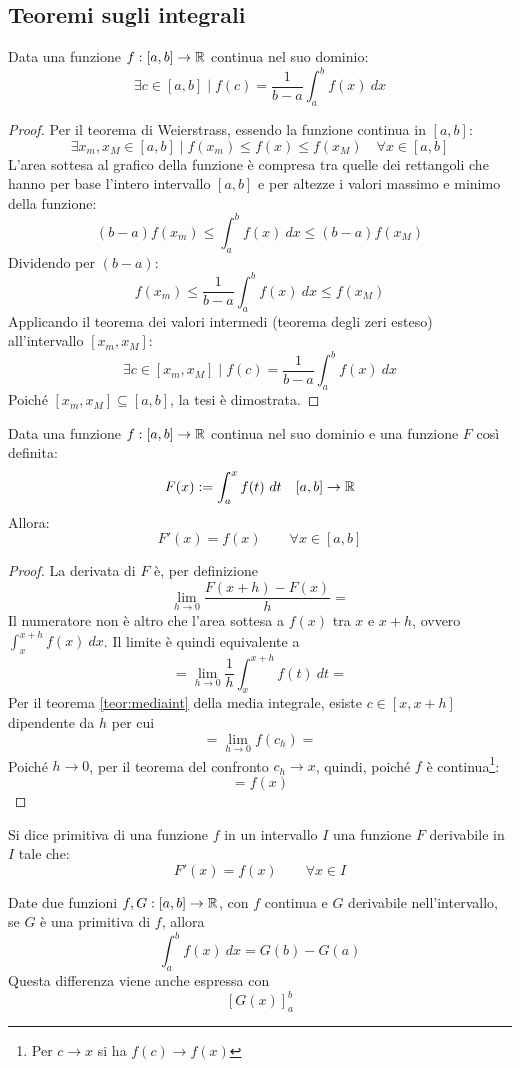 \subsection{Teoremi sugli integrali}
\begin{teor}
	\label{teor:mediaint}
	Data una funzione $f:[a,b]\to\mathbb{R}$ continua nel suo dominio:
	\[
		\exists c\in[a,b]\mid f(c)=\frac{1}{b-a}\int_a^b f(x)~dx
	\]
\end{teor}
\begin{proof}
	Per il teorema di Weierstrass, essendo la funzione continua in $[a,b]$:
	\[
		\exists x_m,x_M\in[a,b]\mid f(x_m)\leq f(x)\leq f(x_M)\quad\forall x\in[a,b]
	\]
	L'area sottesa al grafico della funzione è compresa tra quelle dei rettangoli che hanno per base l'intero intervallo $[a,b]$ e per altezze i valori massimo e minimo della funzione:
	\[
		(b-a)f(x_m)\leq \int_a^b f(x)~dx \leq (b-a)f(x_M)
	\]
	Dividendo per $(b-a)$:
	\[
		f(x_m)\leq \frac{1}{b-a}\int_a^b f(x)~dx \leq f(x_M)
	\]
	Applicando il teorema dei valori intermedi (teorema degli zeri esteso) all'intervallo $[x_m,x_M]$:
	\[
		\exists c\in[x_m,x_M]\mid f(c)=\frac{1}{b-a}\int_a^b f(x)~dx
	\]
	Poiché $[x_m,x_M]\subseteq[a,b]$, la tesi è dimostrata.
\end{proof}
\begin{teor}
	\label{teor:fci}
	Data una funzione $f:[a,b]\to\mathbb{R}$ continua nel suo dominio e una funzione $F$ così definita:
	\[
		F(x):=\int_a^x f(t)~dt\quad[a,b]\to\mathbb{R}
	\]
	Allora:
	\[
		F'(x)=f(x)\qquad\forall x\in[a,b]
	\]
\end{teor}
\begin{proof}
	La derivata di $F$ è, per definizione
	\[
		\lim_{h\to0}\frac{F(x+h)-F(x)}{h}=
	\]
	Il numeratore non è altro che l'area sottesa a $f(x)$ tra $x$ e $x+h$, ovvero $\int_x^{x+h}f(x)~dx$. Il limite è quindi equivalente a
	\[
		=\lim_{h\to0} \frac{1}{h}\int_x^{x+h}f(t)~dt=
	\]
	Per il teorema \ref{teor:mediaint} della media integrale, esiste $c\in[x,x+h]$ dipendente da $h$ per cui
	\[
		=\lim_{h\to0} f(c_h)=
	\]
	Poiché $h\to0$, per il teorema del confronto $c_h\to x$, quindi, poiché $f$ è continua\footnote{Per $c\to x$ si ha $f(c)\to f(x)$}:
	\[
		=f(x)
	\]
\end{proof}
\begin{defin}
	Si dice primitiva di una funzione $f$ in un intervallo $I$ una funzione $F$ derivabile in $I$ tale che:
	\[
		F'(x)=f(x)\qquad\forall x\in I
	\]
\end{defin}
\begin{corol}
	\label{teor:ffci}
	Date due funzioni $f,G:[a,b]\to\mathbb{R}$, con $f$ continua e $G$ derivabile nell'intervallo, se $G$ è una primitiva di $f$, allora
	\[
		\int_a^b f(x)~dx=G(b)-G(a)
	\]
	Questa differenza viene anche espressa con
	\[
		[G(x)]_a^b
	\]
\end{corol}
